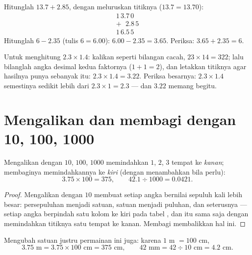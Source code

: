 \begin{example}\label{ex:g6:decimals:addsub}
Hitunglah $13.7 + 2.85$, dengan meluruskan titiknya ($13.7 = 13.70$):
\[
\begin{array}{r}
1\,3.7\,0 \\
+\ \ \,2.8\,5 \\
\hline
1\,6.5\,5
\end{array}
\]
Hitunglah $6 - 2.35$ (tulis $6 = 6.00$):
$6.00 - 2.35 = 3.65$. Periksa: $3.65 + 2.35 = 6$.
\end{example}

\begin{example}\label{ex:g6:decimals:mult}
Untuk menghitung $2.3 \times 1.4$: kalikan seperti bilangan cacah,
$23 \times 14 = 322$; lalu bilanglah angka desimal kedua faktornya
($1 + 1 = 2$), dan letakkan titiknya agar hasilnya punya sebanyak itu:
$2.3 \times 1.4 = 3.22$. Periksa besarnya: $2.3 \times 1.4$
semestinya sedikit lebih dari $2.3 \times 1 = 2.3$ --- dan $3.22$ memang begitu.
\end{example}

\section{Mengalikan dan membagi dengan 10, 100, 1000}

\begin{proposition}\label{prop:g6:decimals:shift}
Mengalikan  dengan $10$, $100$, $1000$ memindahkan
 $1$, $2$, $3$ tempat ke \emph{kanan}; membaginya
memindahkannya ke \emph{kiri} (dengan menambahkan  bila perlu):
\[
3.75 \times 100 = 375, \qquad
42.1 \div 1000 = 0.0421 .
\]
\end{proposition}

\begin{proof}
Mengalikan dengan $10$ membuat setiap angka bernilai sepuluh kali
lebih besar: persepuluhan menjadi satuan, satuan menjadi puluhan, dan
seterusnya --- setiap angka berpindah satu kolom ke kiri pada tabel
, dan itu sama saja dengan memindahkan titiknya satu
tempat ke kanan. Membagi membalikkan hal ini.
\end{proof}

\begin{example}\label{ex:g6:decimals:units}
Mengubah satuan justru permainan ini juga: karena $1$ m $= 100$ cm,
\[
3.75 \text{ m} = 3.75 \times 100 \text{ cm} = 375 \text{ cm},
\qquad
42 \text{ mm} = 42 \div 10 \text{ cm} = 4.2 \text{ cm}.
\]
\end{example}

